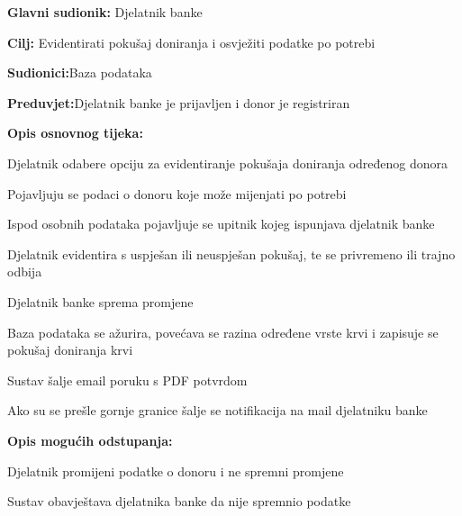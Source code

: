 \begin{packed_item}
	
	\item \textbf{Glavni sudionik: }{Djelatnik banke}
	\item  \textbf{Cilj:} {Evidentirati pokušaj doniranja i osvježiti podatke po potrebi}
	\item  \textbf{Sudionici:}{Baza podataka} 
	\item  \textbf{Preduvjet:}{Djelatnik banke je prijavljen i donor je registriran}
	\item  \textbf{Opis osnovnog tijeka:}
	
	\item[] \begin{packed_enum}
		
		\item {Djelatnik odabere opciju za evidentiranje pokušaja doniranja određenog donora}
		\item {Pojavljuju se podaci o donoru koje može mijenjati po potrebi}
		\item {Ispod osobnih podataka pojavljuje se upitnik kojeg ispunjava djelatnik banke}
		\item {Djelatnik evidentira s uspješan ili neuspješan pokušaj, te se privremeno ili trajno odbija}
		\item {Djelatnik banke sprema promjene}
		\item {Baza podataka se ažurira, povećava se razina određene vrste krvi i zapisuje se pokušaj doniranja krvi}
		\item {Sustav šalje email poruku s PDF potvrdom}
		\item {Ako su se prešle gornje granice šalje se notifikacija na mail djelatniku banke}
	\end{packed_enum}
	\item  \textbf{Opis mogućih odstupanja:}
	
	\item[] \begin{packed_item}
		
		\item[5.a] {Djelatnik promijeni podatke o donoru i ne spremni promjene}
		\item[] \begin{packed_enum}
			
			\item Sustav obavještava djelatnika banke da nije spremnio podatke 
			
		\end{packed_enum}
	\end{packed_item}
	
\end{packed_item}
